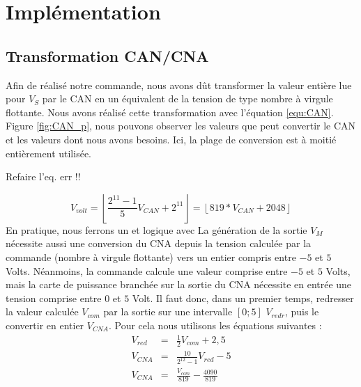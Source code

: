 \chapter{Implémentation}
\section{Transformation CAN/CNA}
Afin de réalisé notre commande, nous avons dût transformer la valeur entière lue pour $V_S$ par le CAN en un équivalent de la tension de type nombre à virgule flottante. Nous avons réalisé cette transformation avec l'équation \ref{equ:CAN}. Figure \ref{fig:CAN_p}, nous pouvons observer les valeurs que peut convertir le CAN et les valeurs dont nous avons besoins. Ici, la plage de conversion est à moitié entièrement utilisée. 
\begin{LARGE}
Refaire l'eq. err !! 
\end{LARGE}
\begin{equation}
\label{equ:CAN}
V_{volt} = 
\left\lfloor 
\frac{2^{11}-1}{5}V_{CAN} +2^{11}
\right\rfloor
= 
\left\lfloor 
819*V_{CAN} + 2048
\right\rfloor
\end{equation}
En pratique, nous ferrons un et logique avec 
La génération de la sortie $V_M$ nécessite aussi une conversion du CNA depuis la tension calculée par la commande (nombre à virgule flottante) vers un entier compris entre $-5$ et $5$ Volts. Néanmoins, la commande calcule une valeur comprise entre $-5$ et $5$ Volts, mais la carte de puissance branchée sur la sortie du CNA nécessite en entrée une tension comprise entre $0$ et $5$ Volt. Il faut donc, dans un premier temps, redresser la valeur calculée $V_{com}$ par la sortie sur une intervalle $\left[0;5\right]$ $V_{redr}$, puis le convertir en entier $V_{CNA}$. Pour cela nous utilisons les équations suivantes :
\begin{equation}
\begin{array}{lcl}
V_{red}	&=&	\frac{1}{2}V_{com}+2,5\\
V_{CNA} &=& \frac{10}{2^{12}-1}V_{red}-5\\
V_{CNA} &=& \frac{V_{com}}{819} - \frac{4090}{819}
\end{array}
\end{equation}
